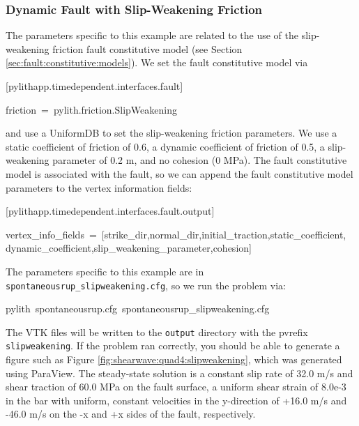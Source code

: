 \subsubsection{Dynamic Fault with Slip-Weakening Friction}

The parameters specific to this example are related to the use of
the slip-weakening friction fault constitutive model (see Section
\vref{sec:fault:constitutive:models}). We set the fault constitutive
model via
\begin{lyxcode}
{[}pylithapp.timedependent.interfaces.fault{]}

friction~=~pylith.friction.SlipWeakening
\end{lyxcode}
and use a UniformDB to set the slip-weakening friction parameters.
We use a static coefficient of friction of 0.6, a dynamic coefficient
of friction of 0.5, a slip-weakening parameter of 0.2 m, and no cohesion
(0 MPa). The fault constitutive model is associated with the fault,
so we can append the fault constitutive model parameters to the vertex
information fields:
\begin{lyxcode}
{[}pylithapp.timedependent.interfaces.fault.output{]}

vertex\_info\_fields~=~{[}strike\_dir,normal\_dir,initial\_traction,static\_coefficient,~\\
dynamic\_coefficient,slip\_weakening\_parameter,cohesion{]}
\end{lyxcode}
The parameters specific to this example are in \texttt{spontaneousrup\_slipweakening.cfg},
so we run the problem via:
\begin{lyxcode}
pylith~spontaneousrup.cfg~spontaneousrup\_slipweakening.cfg
\end{lyxcode}
The VTK files will be written to the \texttt{output} directory with
the pvrefix \texttt{slipweakening}. If the problem ran correctly, you
should be able to generate a figure such as Figure \vref{fig:shearwave:quad4:slipweakening},
which was generated using ParaView. The steady-state solution is a
constant slip rate of 32.0 m/s and shear traction of 60.0 MPa on the
fault surface, a uniform shear strain of 8.0e-3 in the bar with uniform,
constant velocities in the y-direction of +16.0 m/s and -46.0 m/s
on the -x and +x sides of the fault, respectively.

